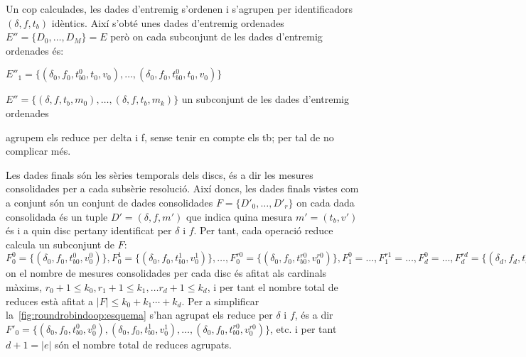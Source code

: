 \todo{}
Un cop calculades, les dades d'entremig s'ordenen i s'agrupen per
identificadors $(\delta,f, t_b)$ idèntics. 
Així s'obté unes dades d'entremig ordenades $E''=\{ D_{0}, \dotsc, D_M\}=E$ 
però on cada subconjunt de les dades d'entremig ordenades és:

$E''_1 = \{  (\delta_0,f_0, t_{b0}^0, t_0,v_0), \dotsc, (\delta_0,f_0, t_{b0}^0, t_0,v_0) \}$


$E''= \{ (\delta,f,t_b,m_0) ,\dotsc, (\delta,f,t_b,m_k) \}$ un
  subconjunt de les dades d'entremig ordenades 


agrupem els reduce per delta i f, sense tenir en compte els tb; per tal de no complicar més.




 Les
dades finals són les sèries temporals dels discs, és a dir les mesures
consolidades per a cada subsèrie resolució. Així doncs, les dades
finals vistes com a conjunt són un conjunt de dades consolidades $F=\{
D'_{0}, \dotsc, D'_r\}$ on cada dada consolidada és un tuple
$D'=(\delta,f,m')$ que indica quina mesura $m'=(t_b,v')$ és i a quin
disc pertany identificat per $\delta$ i $f$.  Per tant, cada operació
reduce calcula un subconjunt de $F$: $F_0^0
=\{(\delta_0,f_0,t_{b0}^0,v_0^0)\}, F_0^1
=\{(\delta_0,f_0,t_{b0}^1,v_0^1)\}, \dotsc, F_0^{r0}
=\{(\delta_0,f_0,t_{b0}^{r0},v_0^{r0})\}, F_1^0= \dotsc, F_1^{r1}=
\dotsc, F_d^0= \dotsc, F_d^{rd}=
\{(\delta_d,f_d,t_{bd}^{rd},v_d^{rd})\}$ on el nombre de mesures
consolidades per cada disc és afitat als cardinals màxims, $r_0 +1
\leq k_0,r_1 +1 \leq k_1, \dotsc r_d +1 \leq k_d$, i per tant el
nombre total de reduces està afitat a $|F| \leq k_0+k_1\dotsb+k_d$.
Per a simplificar la~\autoref{fig:roundrobindoop:esquema} s'han
agrupat els reduce per $\delta$ i $f$, és a dir $F'_0 =
\{(\delta_0,f_0,t_{b0}^0,v_0^0),(\delta_0,f_0,t_{b0}^1,v_0^1),\dotsc,
(\delta_0,f_0,t_{b0}^{r0},v_0^{r0})\}$, etc. i per tant $d+1= |e|$ són
el nombre total de reduces agrupats.






